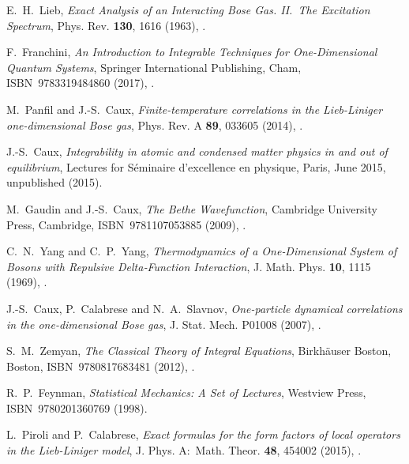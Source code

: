 \documentclass[11pt, a4paper]{report} %
\begin{document}
\begin{thebibliography}{99}
E.~H.~Lieb, \textit{Exact Analysis of an Interacting Bose Gas. II.\ The Excitation Spectrum}, Phys. Rev. \textbf{130}, 1616 (1963), .




F.~Franchini, \textit{An Introduction to Integrable Techniques for One-Dimensional Quantum Systems}, Springer International Publishing, Cham, ISBN~9783319484860 (2017), .




M.~Panfil and J.-S.~Caux, \textit{Finite-temperature correlations in the Lieb-Liniger one-dimensional Bose gas}, Phys. Rev. A \textbf{89}, 033605 (2014), .




J.-S.~Caux, \emph{Integrability in atomic and condensed matter physics in and out of equilibrium}, Lectures for S{\'e}minaire d'excellence en physique, Paris, June 2015, unpublished (2015).



M.~Gaudin and J.-S.~Caux, \textit{The Bethe Wavefunction}, Cambridge University Press, Cambridge, ISBN~9781107053885 (2009), .




C.~N.~Yang and C.~P.~Yang, \textit{Thermodynamics of a One‐Dimensional System of Bosons with Repulsive Delta‐Function Interaction}, J. Math. Phys. \textbf{10}, 1115 (1969), .




J.-S.~Caux, P.~Calabrese and N.~A.~Slavnov, \textit{One-particle dynamical correlations in the one-dimensional Bose gas}, J. Stat. Mech. P01008 (2007), .




S.~M.~Zemyan, \textit{The Classical Theory of Integral Equations}, Birkhäuser Boston, Boston, ISBN~9780817683481 (2012), .




R.~P.~Feynman, \emph{Statistical Mechanics: A Set of Lectures}, Westview Press, ISBN~9780201360769 (1998).





L.~Piroli and P.~Calabrese, \textit{Exact formulas for the form factors of local operators in the Lieb-Liniger model}, J. Phys. A:\ Math. Theor. \textbf{48}, 454002 (2015), .





\end{thebibliography}
\end{document}
